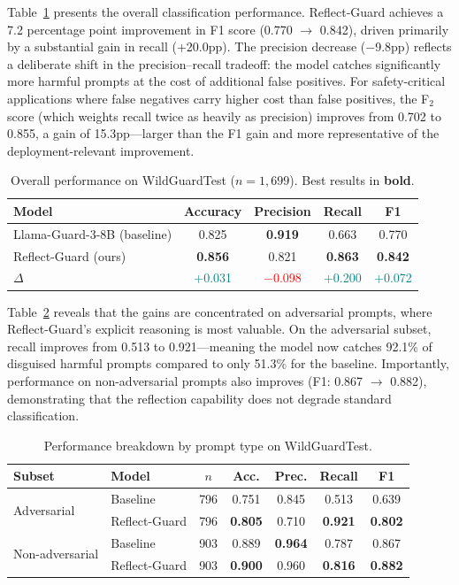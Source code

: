 \documentclass[11pt]{article}
\begin{document}
Table~\ref{tab:wildguard_main} presents the overall classification performance. Reflect-Guard achieves a 7.2 percentage point improvement in F1 score (0.770 $\to$ 0.842), driven primarily by a substantial gain in recall (+20.0pp). The precision decrease ($-$9.8pp) reflects a deliberate shift in the precision--recall tradeoff: the model catches significantly more harmful prompts at the cost of additional false positives. For safety-critical applications where false negatives carry higher cost than false positives, the F$_2$ score (which weights recall twice as heavily as precision) improves from 0.702 to 0.855, a gain of 15.3pp---larger than the F1 gain and more representative of the deployment-relevant improvement.

\begin{table}[t]
  \caption{Overall performance on WildGuardTest ($n = 1{,}699$). Best results in \textbf{bold}.}
  \label{tab:wildguard_main}
  \centering
  \begin{tabular}{lcccc}
    \toprule
    Model & Accuracy & Precision & Recall & F1 \\
    \midrule
    Llama-Guard-3-8B (baseline) & 0.825 & \textbf{0.919} & 0.663 & 0.770 \\
    Reflect-Guard (ours) & \textbf{0.856} & 0.821 & \textbf{0.863} & \textbf{0.842} \\
    \midrule
    $\Delta$ & \textcolor{teal}{+0.031} & \textcolor{red}{$-$0.098} & \textcolor{teal}{+0.200} & \textcolor{teal}{+0.072} \\
    \bottomrule
  \end{tabular}
\end{table}

Table~\ref{tab:wildguard_subset} reveals that the gains are concentrated on adversarial prompts, where Reflect-Guard's explicit reasoning is most valuable. On the adversarial subset, recall improves from 0.513 to 0.921---meaning the model now catches 92.1\% of disguised harmful prompts compared to only 51.3\% for the baseline. Importantly, performance on non-adversarial prompts also improves (F1: 0.867 $\to$ 0.882), demonstrating that the reflection capability does not degrade standard classification.

\begin{table}[t]
  \caption{Performance breakdown by prompt type on WildGuardTest.}
  \label{tab:wildguard_subset}
  \centering
  \begin{tabular}{llccccc}
    \toprule
    Subset & Model & $n$ & Acc. & Prec. & Recall & F1 \\
    \midrule
    \multirow{2}{*}{Adversarial}
    & Baseline & 796 & 0.751 & 0.845 & 0.513 & 0.639 \\
    & Reflect-Guard & 796 & \textbf{0.805} & 0.710 & \textbf{0.921} & \textbf{0.802} \\
    \midrule
    \multirow{2}{*}{Non-adversarial}
    & Baseline & 903 & 0.889 & \textbf{0.964} & 0.787 & 0.867 \\
    & Reflect-Guard & 903 & \textbf{0.900} & 0.960 & \textbf{0.816} & \textbf{0.882} \\
    \bottomrule
  \end{tabular}
\end{table}
\end{document}
